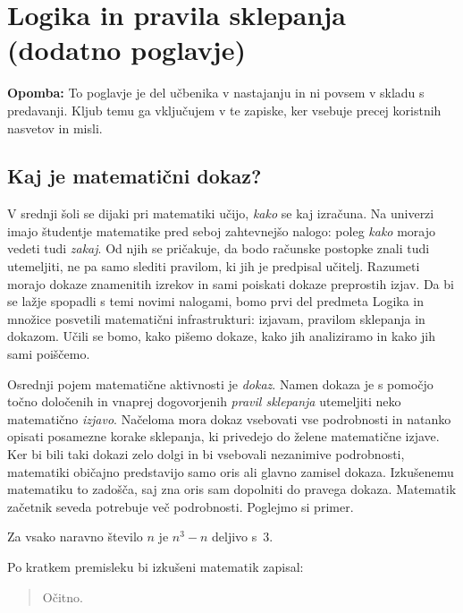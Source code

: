 \chapter{Logika in pravila sklepanja (dodatno poglavje)}
\label{chap:logika}


\textbf{Opomba:} To poglavje je del učbenika v nastajanju in ni povsem v skladu s predavanji. Kljub temu ga vključujem v te zapiske, ker vsebuje precej koristnih nasvetov in misli.

\section{Kaj je matematični dokaz?}
\label{sec:kaj-je-dokaz}

V srednji šoli se dijaki pri matematiki učijo, \emph{kako} se kaj
izračuna. Na univerzi imajo študentje matematike pred seboj
zahtevnejšo nalogo: poleg \emph{kako} morajo vedeti tudi \emph{zakaj}.
Od njih se pričakuje, da bodo računske postopke znali tudi utemeljiti,
ne pa samo slediti pravilom, ki jih je predpisal učitelj. Razumeti
morajo dokaze znamenitih izrekov in sami poiskati dokaze preprostih
izjav. Da bi se lažje spopadli s temi novimi nalogami, bomo prvi del
predmeta Logika in množice posvetili matematični infrastrukturi:
izjavam, pra\-vi\-lom sklepanja in dokazom. Učili se bomo, kako pišemo
dokaze, kako jih analiziramo in kako jih sami poiščemo.

Osrednji pojem matematične aktivnosti je \emph{dokaz}. Namen dokaza je
s pomočjo točno določenih in vnaprej dogovorjenih \emph{pravil
  sklepanja} utemeljiti neko matematično \emph{izjavo}. Načeloma mora
dokaz vsebovati vse podrobnosti in natanko opisati posamezne korake
sklepanja, ki privedejo do želene matematične izjave. Ker bi bili taki
dokazi zelo dolgi in bi vsebovali nezanimive podrobnosti, matematiki
običajno predstavijo samo oris ali glavno zamisel dokaza. Izkušenemu
matematiku to zadošča, saj zna oris sam dopolniti do pravega dokaza.
Matematik začetnik seveda potrebuje več podrobnosti. Poglejmo si
primer.

\begin{izrek}
  \label{izr:n3-n-deljivo-3}
  Za vsako naravno število $n$ je $n^3 - n$ deljivo s~$3$.
\end{izrek}

\noindent
Po kratkem premisleku bi izkušeni matematik zapisal:

\begin{quote}
  \begin{dokaz}
    Očitno.
  \end{dokaz}
\end{quote}


